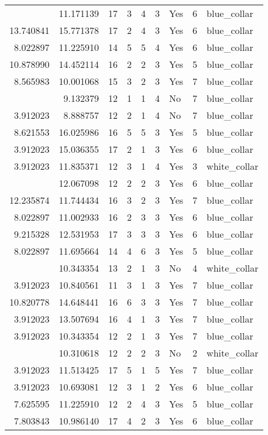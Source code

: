 \documentclass[
]{article}
\begin{document}
\begin{longtable}[t]{rrrrrllrl}
\addlinespace
8.306472 & 11.171139 & 17 & 3 & 4 & 3 & Yes & 6 & blue\_collar\\
13.740841 & 15.771378 & 17 & 2 & 4 & 3 & Yes & 6 & blue\_collar\\
8.022897 & 11.225910 & 14 & 5 & 5 & 4 & Yes & 6 & blue\_collar\\
10.878990 & 14.452114 & 16 & 2 & 2 & 3 & Yes & 5 & blue\_collar\\
8.565983 & 10.001068 & 15 & 3 & 2 & 3 & Yes & 7 & blue\_collar\\
\addlinespace
3.912023 & 9.132379 & 12 & 1 & 1 & 4 & No & 7 & blue\_collar\\
3.912023 & 8.888757 & 12 & 2 & 1 & 4 & No & 7 & blue\_collar\\
8.621553 & 16.025986 & 16 & 5 & 5 & 3 & Yes & 5 & blue\_collar\\
3.912023 & 15.036355 & 17 & 2 & 1 & 3 & Yes & 6 & blue\_collar\\
3.912023 & 11.835371 & 12 & 3 & 1 & 4 & Yes & 3 & white\_collar\\
\addlinespace
11.002933 & 12.067098 & 12 & 2 & 2 & 3 & Yes & 6 & blue\_collar\\
12.235874 & 11.744434 & 16 & 3 & 2 & 3 & Yes & 7 & blue\_collar\\
8.022897 & 11.002933 & 16 & 2 & 3 & 3 & Yes & 6 & blue\_collar\\
9.215328 & 12.531953 & 17 & 3 & 3 & 3 & Yes & 6 & blue\_collar\\
8.022897 & 11.695664 & 14 & 4 & 6 & 3 & Yes & 5 & blue\_collar\\
\addlinespace
3.912023 & 10.343354 & 13 & 2 & 1 & 3 & No & 4 & white\_collar\\
3.912023 & 10.840561 & 11 & 3 & 1 & 3 & Yes & 7 & blue\_collar\\
10.820778 & 14.648441 & 16 & 6 & 3 & 3 & Yes & 7 & blue\_collar\\
3.912023 & 13.507694 & 16 & 4 & 1 & 3 & Yes & 7 & blue\_collar\\
3.912023 & 10.343354 & 12 & 2 & 1 & 3 & Yes & 7 & blue\_collar\\
\addlinespace
9.743906 & 10.310618 & 12 & 2 & 2 & 3 & No & 2 & white\_collar\\
3.912023 & 11.513425 & 17 & 5 & 1 & 5 & Yes & 7 & blue\_collar\\
3.912023 & 10.693081 & 12 & 3 & 1 & 2 & Yes & 6 & blue\_collar\\
7.625595 & 11.225910 & 12 & 2 & 4 & 3 & Yes & 5 & blue\_collar\\
7.803843 & 10.986140 & 17 & 4 & 2 & 3 & Yes & 6 & blue\_collar\\

\end{longtable}
\end{document}
